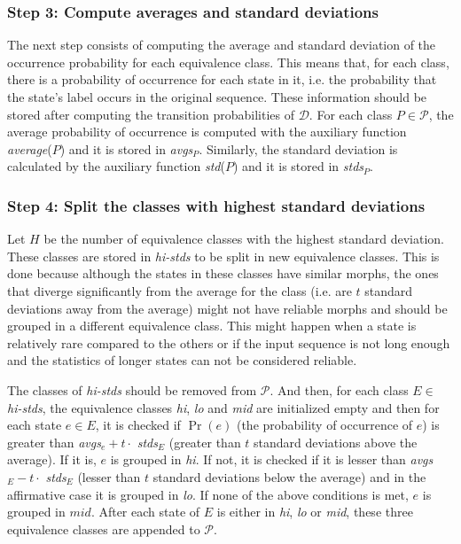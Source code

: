 {\subsubsection{Step 3: Compute averages and standard deviations}

The next step consists of computing the average and standard deviation of the occurrence probability for each equivalence class. This means that, for each class, there is a probability of occurrence for each state in it, i.e. the probability that the state's label occurs in the original sequence. These information should be stored after computing the transition probabilities of $\mathcal{D}$. For each class $P\in\mathcal{P}$, the average probability of occurrence is computed with the auxiliary function \textit{average}($P$) and it is stored in \textit{avgs}$_P$. Similarly, the standard deviation is calculated by the auxiliary function \textit{std}($P$) and it is stored in \textit{stds}$_P$.

\subsubsection{Step 4: Split the classes with highest standard deviations}

Let $H$ be the number of equivalence classes with the highest standard deviation. These classes are stored in \textit{hi-stds} to be split in new equivalence classes. This is done because although the states in these classes have similar morphs, the ones that diverge significantly from the average for the class (i.e. are $t$ standard deviations away from the average) might not have reliable morphs and should be grouped in a different equivalence class. This might happen when a state is relatively rare compared to the others or if the input sequence is not long enough and the statistics of longer states can not be considered reliable.

The classes of \textit{hi-stds} should be removed from $\mathcal{P}$. And then, for each class $E \in$ \textit{hi-stds}, the equivalence classes \textit{hi}, \textit{lo} and \textit{mid} are initialized empty and then for each state $e \in E$, it is checked if $\Pr(e)$ (the probability of occurrence of $e$) is greater than \textit{avgs}$_e + t\cdot$ \textit{stds}$_E$ (greater than $t$ standard deviations above the average). If it is, $e$ is grouped in \textit{hi}. If not, it is checked if it is lesser than \textit{avgs}$_E - t\cdot $ \textit{stds}$_E$ (lesser than $t$ standard deviations below the average) and in the affirmative case it is grouped in \textit{lo}. If none of the above conditions is met, $e$ is grouped in $mid$. After each state of $E$ is either in \textit{hi}, \textit{lo} or \textit{mid}, these three equivalence classes are appended to $\mathcal{P}$.

}
